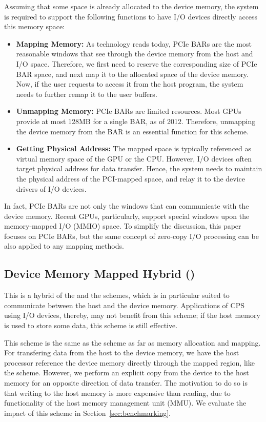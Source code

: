 Assuming that some space is already allocated to the device
memory, the system is required to support the following functions to have I/O
devices directly access this memory space:

\begin{itemize}
 \item \textbf{Mapping Memory:}
       As technology reads today, PCIe BARs are the most reasonable
       windows that see through the device memory from the host and I/O
       space.
       Therefore, we first need to reserve the corresponding size of
       PCIe BAR space, and next map it to the allocated space of the
       device memory.
       Now, if the user requests to access it from the host program, the
       system needs to further remap it to the user buffers.
 \item \textbf{Unmapping Memory:}
       PCIe BARs are limited resources. Most GPUs provide at most 128MB
       for a single BAR, as of 2012.
       Therefore, unmapping the device memory from the BAR is an essential
       function for this scheme.
 \item \textbf{Getting Physical Address:}
       The mapped space is typically referenced as virtual memory space
       of the GPU or the CPU.
       However, I/O devices often target physical address for data transfer.
       Hence, the system needs to maintain the physical address of the
       PCI-mapped space, and relay it to the device drivers of I/O devices.
\end{itemize}

In fact, PCIe BARs are not only the windows that can communicate with
the device memory.
Recent GPUs, particularly, support special windows upon the
memory-mapped I/O (MMIO) space.
To simplify the discussion, this paper focuses on PCIe BARs, but the
same concept of zero-copy I/O processing can be also applied to any
mapping methods.

\subsection{Device Memory Mapped Hybrid ({\dmh})}
\label{sec:dmh}

This is a hybrid of the {\dm} and the {\hd} schemes, which is in
particular suited to communicate between the host and the device
memory.
Applications of CPS using I/O devices, thereby, may not benefit from
this scheme; if the host memory is used to store some data, this scheme
is still effective.

This scheme is the same as the {\dm} scheme as far as memory allocation
and mapping.
For transfering data from the host to the device memory, we have the
host processor reference the device memory directly through the
mapped region, like the {\dm} scheme.
However, we perform an explicit copy from the device to the host memory
for an opposite direction of data transfer.
The motivation to do so is that writing to the host memory is more
expensive than reading, due to functionality of the host memory
management unit (MMU).
We evaluate the impact of this scheme in Section~\ref{sec:benchmarking}.
